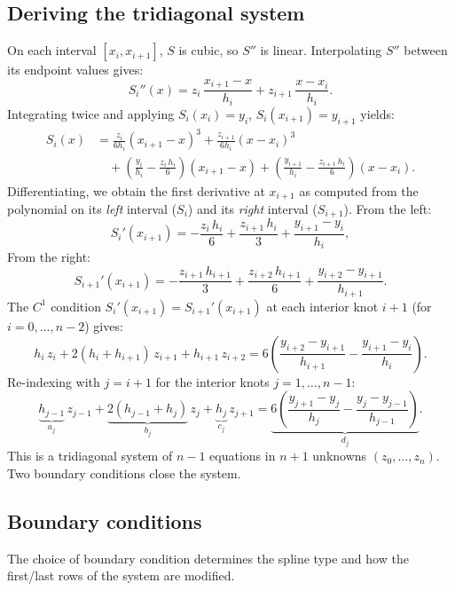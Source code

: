 \documentclass[11pt]{article}
\begin{document}
\subsection{Deriving the tridiagonal system}

On each interval $[x_i, x_{i+1}]$, $S$ is cubic, so $S''$ is linear.
Interpolating $S''$ between its endpoint values gives:
\[
S_i''(x) = z_i \,\frac{x_{i+1} - x}{h_i} + z_{i+1}\,\frac{x - x_i}{h_i}.
\]
Integrating twice and applying $S_i(x_i) = y_i$, $S_i(x_{i+1}) = y_{i+1}$
yields:
\begin{align*}
S_i(x) &= \frac{z_i}{6h_i}(x_{i+1}-x)^3
         + \frac{z_{i+1}}{6h_i}(x - x_i)^3 \\
       &\quad + \left(\frac{y_i}{h_i} - \frac{z_i\,h_i}{6}\right)(x_{i+1}-x)
         + \left(\frac{y_{i+1}}{h_i} - \frac{z_{i+1}\,h_i}{6}\right)(x - x_i).
\end{align*}
Differentiating, we obtain the first derivative at $x_{i+1}$ as
computed from the polynomial on its \emph{left} interval ($S_i$)
and its \emph{right} interval ($S_{i+1}$).
From the left:
\[
S_i'(x_{i+1}) = -\frac{z_i\,h_i}{6} + \frac{z_{i+1}\,h_i}{3}
  + \frac{y_{i+1} - y_i}{h_i},
\]
From the right:
\[
S_{i+1}'(x_{i+1}) = -\frac{z_{i+1}\,h_{i+1}}{3} + \frac{z_{i+2}\,h_{i+1}}{6}
  + \frac{y_{i+2} - y_{i+1}}{h_{i+1}}.
\]
The $C^1$ condition $S_i'(x_{i+1}) = S_{i+1}'(x_{i+1})$ at each
interior knot $i+1$ (for $i = 0, \ldots, n-2$) gives:
\begin{equation}\label{eq:spline_tridiag}
h_i \, z_i + 2(h_i + h_{i+1})\, z_{i+1} + h_{i+1}\, z_{i+2}
= 6\left(\frac{y_{i+2} - y_{i+1}}{h_{i+1}} - \frac{y_{i+1} - y_i}{h_i}\right).
\end{equation}
Re-indexing with $j = i+1$ for the interior knots $j = 1, \ldots, n-1$:
\[
\underbrace{h_{j-1}}_{a_j}\, z_{j-1}
+ \underbrace{2(h_{j-1} + h_j)}_{b_j}\, z_j
+ \underbrace{h_j}_{c_j}\, z_{j+1}
= \underbrace{6\!\left(\frac{y_{j+1} - y_j}{h_j}
  - \frac{y_j - y_{j-1}}{h_{j-1}}\right)}_{d_j}.
\]
This is a tridiagonal system of $n-1$ equations in $n+1$ unknowns
$(z_0, \ldots, z_n)$. Two boundary conditions close the system.

\subsection{Boundary conditions}

The choice of boundary condition determines the spline type
and how the first/last rows of the system are modified.
\end{document}
